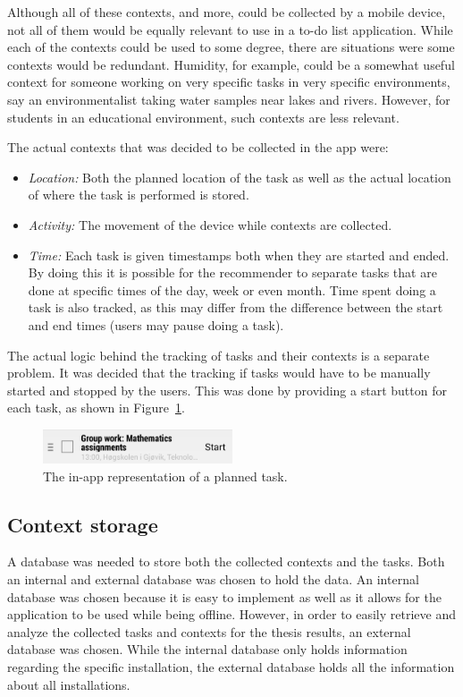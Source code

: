 Although all of these contexts, and more, could be collected by a mobile device, not all of them would be equally relevant to use in a to-do list application. While each of the contexts could be used to some degree, there are situations were some contexts would be redundant. Humidity, for example, could be a somewhat useful context for someone working on very specific tasks in very specific environments, say an environmentalist taking water samples near lakes and rivers. However, for students in an educational environment, such contexts are less relevant.

The actual contexts that was decided to be collected in the app were:
\begin{itemize}
	\item \emph{Location:} Both the planned location of the task as well as the actual location of where the task is performed is stored.
	\item \emph{Activity:} The movement of the device while contexts are collected.
	\item \emph{Time:} Each task is given timestamps both when they are started and ended. By doing this it is possible for the recommender to separate tasks that are done at specific times of the day, week or even month. Time spent doing a task is also tracked, as this may differ from the difference between the start and end times (users may pause doing a task).
\end{itemize}

The actual logic behind the tracking of tasks and their contexts is a separate problem. It was decided that the tracking if tasks would have to be manually started and stopped by the users. This was done by providing a start button for each task, as shown in Figure~\ref{fig:taskrepresentation}.
\begin{figure}[tbp]
  \centering
  \includegraphics[width=0.5\textwidth]{figures/TaskRepresentation.png}
  \caption[In-app representation of task]{The in-app representation of a planned task.}
  \label{fig:taskrepresentation}
\end{figure} 

\subsection{Context storage}
A database was needed to store both the collected contexts and the tasks. Both an internal and external database was chosen to hold the data. An internal database was chosen because it is easy to implement as well as it allows for the application to be used while being offline. However, in order to easily retrieve and analyze the collected tasks and contexts for the thesis results, an external database was chosen. While the internal database only holds information regarding the specific installation, the external database holds all the information about all installations.

